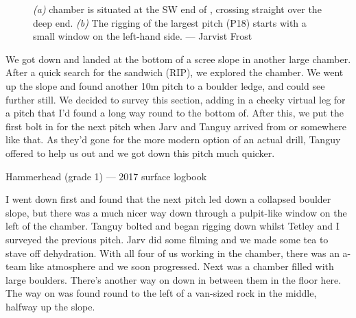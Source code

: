 \begin{figure*}[t!]
	\checkoddpage \ifoddpage \forcerectofloat \else \forceversofloat \fi
	\centering
	\begin{subfigure}[t]{0.6337\textwidth}
		\centering
		 \caption{}\label{hammerhead passage}
	\end{subfigure}
  	 \hfill
   	 \begin{subfigure}[t]{0.3563\textwidth}
        		\centering
        		\caption{} \label{hammerhead pitch}
        \end{subfigure}
	\caption{
	 	  \textit{(a)} \protect{} chamber is situated at the SW end of \protect{}, crossing straight over the deep end.  
   		 \textit{(b)} The rigging of the largest \protect{} pitch (P18) starts with a small window on the left-hand side. --- Jarvist Frost}
\end{figure*}

We got down and landed at the bottom of a scree slope in another large chamber. After a quick search for the sandwich (RIP), we explored the chamber. We went up the slope and found another 10m pitch to a boulder ledge, and could see further still.  We decided to survey this section, adding in a cheeky virtual leg for a pitch that I'd found a long way round to the bottom of. After this, we put the first bolt in for the next pitch when Jarv and Tanguy arrived from  or somewhere like that. As they'd gone for the more modern option of an actual drill, Tanguy offered to help us out and we got down this pitch much quicker. 

\begin{survey}[t!]
\checkoddpage \ifoddpage \forcerectofloat \else \forceversofloat \fi
 \centering
{}
\caption[Hammerhead plan (grade 1)]{Hammerhead (grade 1) --- 2017 surface logbook}
\end{survey}

I went down first and found that the next pitch led down a collapsed boulder slope, but there was a much nicer way down through a pulpit-like window on the left of the chamber. Tanguy bolted and began rigging down whilst Tetley and I surveyed the previous pitch. Jarv did some filming and we made some tea to stave off dehydration. With all four of us working in the chamber, there was an a-team like atmosphere and we soon progressed. Next was a chamber filled with large boulders. There's another way on down in between them in the floor here. The way on was found round to the left of a van-sized rock in the middle, halfway up the slope.

